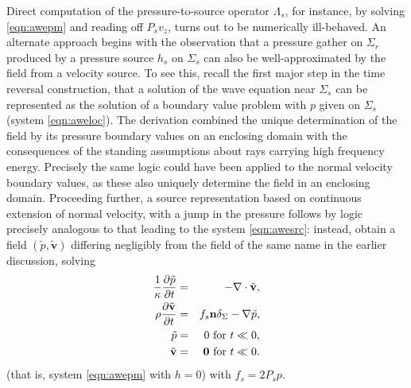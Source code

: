 \documentclass[georeport,12pt]{geophysics}
\newcommand{\bv}{\mathbf{v}}
\begin{document}
Direct computation of the pressure-to-source operator $\Lambda_s$, for instance, by solving
\ref{eqn:awepm} and reading off $P_sv_{z}$, turns out to be
numerically ill-behaved. An alternate approach begins with the
observation that a pressure gather on $\Sigma_r$ produced by a
pressure source $h_s$ on $\Sigma_s$ can also be well-approximated by
the field from a velocity source. To see this, recall the first major
step in the time reversal construction, that a solution of the wave
equation near $\Sigma_s$ can be represented as the solution of a
boundary value problem with $p$ given on $\Sigma_s$ (system
\ref{eqn:aweloc}). The derivation combined the unique determination of
the field by its pressure boundary values on an enclosing domain with
the consequences of the standing assumptions about rays carrying high
frequency energy. Precisely the same logic could have been applied to
the normal velocity boundary values, as these also uniquely determine
the field in an enclosing domain. Proceeding further, a source
representation based on continuous extension of normal velocity, with
a jump in the pressure follows by logic precisely analogous to that
leading to the system \ref{eqn:awesrc}: instead, obtain a field
$(\tilde{p},\tilde{\bv})$ differing negligibly from the field of the
same name in the earlier discussion, solving 
\begin{eqnarray}
\label{eqn:awesrcvzmod}
  \frac{1}{\kappa}\frac{\partial\tilde{p}}{\partial t} & = & 
                                                      - \nabla \cdot \tilde{\bv}, \nonumber \\
  \rho\frac{\partial \tilde{\bv}}{\partial t} & = & f_s {\bf n}\delta_{\Sigma}- \nabla \tilde{p}, \nonumber \\
  \tilde{p} & = & 0 \mbox{ for }  t \ll 0, \nonumber \\
  \tilde{\bv} & = & {\bf 0} \mbox{ for }  t \ll  0.       
\end{eqnarray}
(that is, system \ref{eqn:awepm} with $h=0$) with $f_s = 2P_sp$.
\end{document}
